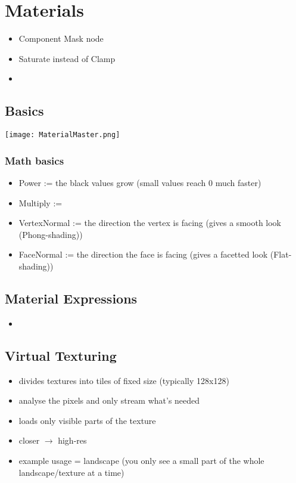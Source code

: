 \chapter{Materials}
\begin{itemize}
    \item Component Mask node
    \item Saturate instead of Clamp
    \item 
\end{itemize}

    \section{Basics}
        \texttt{[image: MaterialMaster.png]} \\
        \subsection{Math basics}
            \begin{itemize}
                \item Power := the black values grow (small values reach 0 much faster)
                \item Multiply := 
                \item VertexNormal := the direction the vertex is facing (gives a smooth look (Phong-shading))
                \item FaceNormal := the direction the face is facing (gives a facetted look (Flat-shading))
            \end{itemize}


    \section{Material Expressions}
        \begin{itemize}
            \item 
        \end{itemize}

    \section{Virtual Texturing}
        \begin{itemize}
            \item divides textures into tiles of fixed size (typically 128x128)
            \item analyse the pixels and only stream what's needed
            \item loads only visible parts of the texture
            \item closer $\rightarrow$ high-res
            \item example usage = landscape (you only see a small part of the whole landscape/texture at a time)
        \end{itemize}

